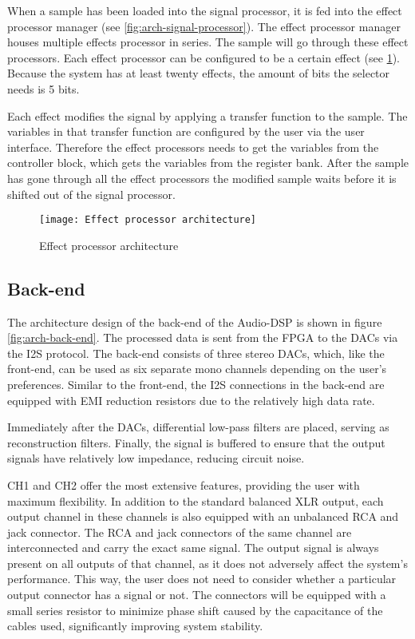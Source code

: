 When a sample has been loaded into the signal processor, it is fed into the effect processor manager (see \ref{fig:arch-signal-processor}). The effect processor manager houses multiple effects processor in series. The sample will go through these effect processors. Each effect processor can be configured to be a certain effect (see \ref{fig:arch-effect-processor}). Because the system has at least twenty effects, the amount of bits the selector needs is 5 bits.

Each effect modifies the signal by applying a transfer function to the sample. The variables in that transfer function are configured by the user via the user interface. Therefore the effect processors needs to get the variables from the controller block, which gets the variables from the register bank. After the sample has gone through all the effect processors the modified sample waits before it is shifted out of the signal processor. 

\begin{figure}[ht]
    \texttt{[image: Effect processor architecture]}
    \caption{Effect processor architecture}
    \label{fig:arch-effect-processor}
\end{figure}

\subsection{Back-end}
The architecture design of the back-end of the Audio-DSP is shown in figure \ref{fig:arch-back-end}. The processed data is sent from the FPGA to the DACs via the I2S protocol. The back-end consists of three stereo DACs, which, like the front-end, can be used as six separate mono channels depending on the user's preferences. Similar to the front-end, the I2S connections in the back-end are equipped with EMI reduction resistors due to the relatively high data rate.

Immediately after the DACs, differential low-pass filters are placed, serving as reconstruction filters. Finally, the signal is buffered to ensure that the output signals have relatively low impedance, reducing circuit noise.

CH1 and CH2 offer the most extensive features, providing the user with maximum flexibility. In addition to the standard balanced XLR output, each output channel in these channels is also equipped with an unbalanced RCA and jack connector. The RCA and jack connectors of the same channel are interconnected and carry the exact same signal. The output signal is always present on all outputs of that channel, as it does not adversely affect the system's performance. This way, the user does not need to consider whether a particular output connector has a signal or not. The connectors will be equipped with a small series resistor to minimize phase shift caused by the capacitance of the cables used, significantly improving system stability.

